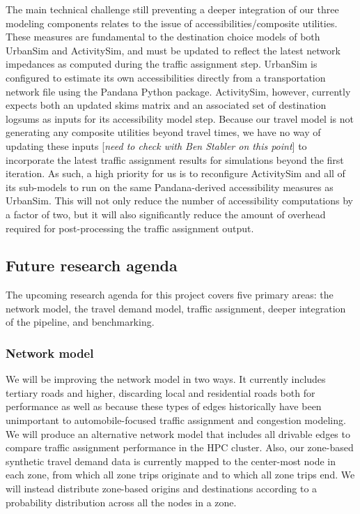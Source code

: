 The main technical challenge still preventing a deeper integration of our three modeling components relates to the issue of accessibilities/composite utilities. These measures are fundamental to the destination choice models of both UrbanSim and ActivitySim, and must be updated to reflect the latest network impedances as computed during the traffic assignment step. UrbanSim is configured to estimate its own accessibilities directly from a transportation network file using the Pandana Python package. ActivitySim, however, currently expects both an updated skims matrix and an associated set of destination logsums as inputs for its accessibility model step. Because our travel model is not generating any composite utilities beyond travel times, we have no way of updating these inputs [\textit{need to check with Ben Stabler on this point}] to incorporate the latest traffic assignment results for simulations beyond the first iteration. As such, a high priority for us is to reconfigure ActivitySim and all of its sub-models to run on the same Pandana-derived accessibility measures as UrbanSim. This will not only reduce the number of accessibility computations by a factor of two, but it will also significantly reduce the amount of overhead required for post-processing the traffic assignment output.


\subsection{Future research agenda}

The upcoming research agenda for this project covers five primary areas: the network model, the travel demand model, traffic assignment, deeper integration of the pipeline, and benchmarking.

\subsubsection{Network model}

We will be improving the network model in two ways. It currently includes tertiary roads and higher, discarding local and residential roads both for performance as well as because these types of edges historically have been unimportant to automobile-focused traffic assignment and congestion modeling. We will produce an alternative network model that includes all drivable edges to compare traffic assignment performance in the HPC cluster. Also, our zone-based synthetic travel demand data is currently mapped to the center-most node in each zone, from which all zone trips originate and to which all zone trips end. We will instead distribute zone-based origins and destinations according to a probability distribution across all the nodes in a zone.

